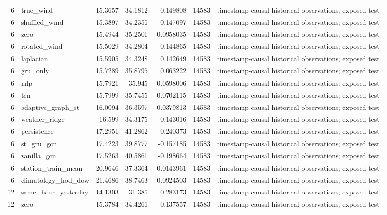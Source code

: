 \begin{tabular}{rlrrrrl}
6 & true\_wind & 15.3657 & 34.1812 & 0.149808 & 14583 & timestamp-causal historical observations; exposed test \\
6 & shuffled\_wind & 15.3897 & 34.2356 & 0.147097 & 14583 & timestamp-causal historical observations; exposed test \\
6 & zero & 15.4944 & 35.2501 & 0.0958035 & 14583 & timestamp-causal historical observations; exposed test \\
6 & rotated\_wind & 15.5029 & 34.2804 & 0.144865 & 14583 & timestamp-causal historical observations; exposed test \\
6 & laplacian & 15.5905 & 34.3248 & 0.142649 & 14583 & timestamp-causal historical observations; exposed test \\
6 & gru\_only & 15.7289 & 35.8796 & 0.063222 & 14583 & timestamp-causal historical observations; exposed test \\
6 & mlp & 15.7921 & 35.945 & 0.0598006 & 14583 & timestamp-causal historical observations; exposed test \\
6 & tcn & 15.7999 & 35.7455 & 0.0702115 & 14583 & timestamp-causal historical observations; exposed test \\
6 & adaptive\_graph\_st & 16.0094 & 36.3597 & 0.0379813 & 14583 & timestamp-causal historical observations; exposed test \\
6 & weather\_ridge & 16.599 & 34.3175 & 0.143016 & 14583 & timestamp-causal historical observations; exposed test \\
6 & persistence & 17.2951 & 41.2862 & -0.240373 & 14583 & timestamp-causal historical observations; exposed test \\
6 & st\_gru\_gcn & 17.4223 & 39.8777 & -0.157185 & 14583 & timestamp-causal historical observations; exposed test \\
6 & vanilla\_gcn & 17.5263 & 40.5861 & -0.198664 & 14583 & timestamp-causal historical observations; exposed test \\
6 & station\_train\_mean & 20.9646 & 37.3364 & -0.0143961 & 14583 & timestamp-causal historical observations; exposed test \\
6 & climatology\_hod\_dow & 21.4686 & 38.7463 & -0.0924503 & 14583 & timestamp-causal historical observations; exposed test \\
12 & same\_hour\_yesterday & 14.1303 & 31.386 & 0.283173 & 14583 & timestamp-causal historical observations; exposed test \\
12 & zero & 15.3784 & 34.4266 & 0.137557 & 14583 & timestamp-causal historical observations; exposed test \\

\end{tabular}
